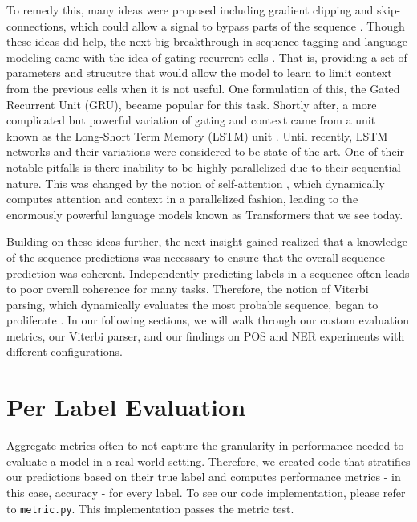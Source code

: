 \documentclass[11pt,a4paper]{article}
\begin{document}
To remedy this, many ideas were proposed including gradient clipping and skip-connections, which could allow a signal to bypass parts of the sequence \cite{hochreiter1998vanishing}. Though these ideas did help, the next big breakthrough in sequence tagging and language modeling came with the idea of gating recurrent cells \cite{chung2014empirical}. That is, providing a set of parameters and strucutre that would allow the model to learn to limit context from the previous cells when it is not useful. One formulation of this, the Gated Recurrent Unit (GRU), became popular for this task. Shortly after, a more complicated but powerful variation of gating and context came from a unit known as the Long-Short Term Memory (LSTM) unit \cite{huang2015bidirectional}. Until recently, LSTM networks and their variations were considered to be state of the art. One of their notable pitfalls is there inability to be highly parallelized due to their sequential nature. This was changed by the notion of self-attention \cite{vaswani2017attention}, which dynamically computes attention and context in a parallelized fashion, leading to the enormously powerful language models known as Transformers that we see today.

Building on these ideas further, the next insight gained realized that a knowledge of the sequence predictions was necessary to ensure that the overall sequence prediction was coherent. Independently predicting labels in a sequence often leads to poor overall coherence for many tasks. Therefore, the notion of Viterbi parsing, which dynamically evaluates the most probable sequence, began to proliferate \cite{ma2016end}. In our following sections, we will walk through our custom evaluation metrics, our Viterbi parser, and our findings on POS and NER experiments with different configurations.



\section{Per Label Evaluation}%
\label{sec:per_label_evaluation}

Aggregate metrics often to not capture the granularity in performance needed to evaluate a 
model in a real-world setting. Therefore, we created code that stratifies our predictions
based on their true label and computes performance metrics - in this case, accuracy - for every label. To see our code implementation, please refer to \texttt{metric.py}. This implementation passes the metric test.
\end{document}
